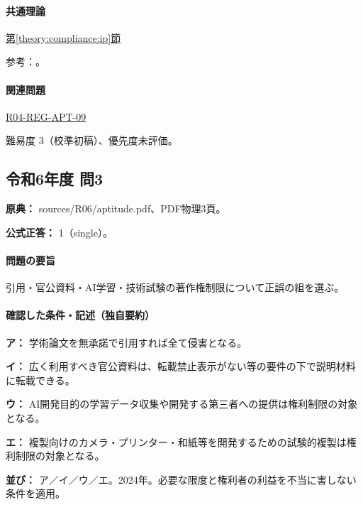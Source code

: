 \paragraph{共通理論} \hyperref[theory:compliance:ip]{第\ref*{theory:compliance:ip}節}

\par 参考：\cite{jpo_ip_overview}。

\paragraph{関連問題} \hyperref[q:r04-reg-apt-09]{R04-REG-APT-09}

\par 難易度 3（校準初稿）、優先度未評価。

\subsection{令和6年度 問3}
\label{q:r06-reg-apt-03}

\noindent\textbf{原典：} sources/R06/aptitude.pdf、PDF物理3頁。

\textbf{公式正答：} 1（single）。

\paragraph{問題の要旨} 引用・官公資料・AI学習・技術試験の著作権制限について正誤の組を選ぶ。

\paragraph{確認した条件・記述（独自要約）}\mbox{}\par

\noindent\textbf{ア：} 学術論文を無承諾で引用すれば全て侵害となる。\par

\noindent\textbf{イ：} 広く利用すべき官公資料は、転載禁止表示がない等の要件の下で説明材料に転載できる。\par

\noindent\textbf{ウ：} AI開発目的の学習データ収集や開発する第三者への提供は権利制限の対象となる。\par

\noindent\textbf{エ：} 複製向けのカメラ・プリンター・和紙等を開発するための試験的複製は権利制限の対象となる。\par

\noindent\textbf{並び：} ア／イ／ウ／エ。2024年。必要な限度と権利者の利益を不当に害しない条件を適用。\par

